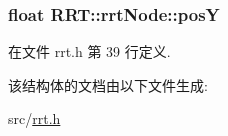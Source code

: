 \hypertarget{structRRT_1_1rrtNode_a219cf78a0f5689bc84744df52c37e84d}{
\subsubsection[{pos\-Y}]{\setlength{\rightskip}{0pt plus 5cm}float R\-R\-T\-::rrt\-Node\-::pos\-Y}}\label{structRRT_1_1rrtNode_a219cf78a0f5689bc84744df52c37e84d}


在文件 rrt.\-h 第 39 行定义.



该结构体的文档由以下文件生成\-:\begin{DoxyCompactItemize}
\item 
src/\hyperlink{rrt_8h}{rrt.\-h}\end{DoxyCompactItemize}
